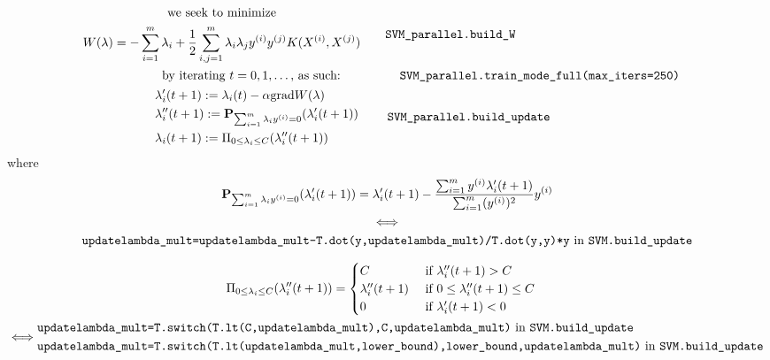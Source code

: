 \documentclass[10pt]{amsart}
\begin{document}
\begin{multicols*}{2}
\[
\begin{aligned}
  \begin{gathered}
    \text{ we seek to minimize } \\
    W(\lambda) = - \sum_{i=1}^m \lambda_i + \frac{1}{2} \sum_{i,j=1}^m \lambda_i \lambda_j y^{(i)} y^{(j)} K(X^{(i)},X^{(j)}) 
  \end{gathered} \quad & \quad   \verb|SVM_parallel.build_W| \\
  \text{  by iterating $t=0,1,\dots $, as such: } \qquad \, & \qquad \, \verb|SVM_parallel.train_mode_full(max_iters=250)|  \\
  \begin{aligned}
    & \lambda_i'(t+1):=\lambda_i(t) - \alpha \text{grad}{ W(\lambda) } \\ 
    & \lambda''_i(t+1):= \mathbf{P}_{\sum_{i=1}^m \lambda_i y^{(i)} = 0 }( \lambda_i'(t+1)) \\ 
    & \lambda_i(t+1) := \Pi_{0\leq \lambda_i \leq C}(\lambda_i''(t+1))
  \end{aligned} \quad \, &
  \quad \, \verb|SVM_parallel.build_update|  
  \end{aligned}
\]
where
\[
\begin{gathered}
\mathbf{P}_{\sum_{i=1}^m \lambda_i y^{(i)} = 0 }( \lambda_i'(t+1)) = \lambda_i'(t+1) - \frac{ \sum_{i=1}^m y^{(i)}\lambda_i'(t+1) }{ \sum_{i=1}^m (y^{(i)})^2 } y^{(i)} \\ 
\Longleftrightarrow \\
\verb|updatelambda_mult=updatelambda_mult-T.dot(y,updatelambda_mult)/T.dot(y,y)*y| \text{ in } \verb|SVM.build_update|
\end{gathered}
\]

\[
\begin{gathered}
  \begin{aligned}
  & \Pi_{0\leq \lambda_i \leq C}(\lambda_i''(t+1)) = \begin{cases} C & \text{ if } \lambda_i''(t+1) > C \\
    \lambda_i''(t+1) & \text{ if } 0 \leq \lambda_i''(t+1) \leq C \\
    0 & \text{ if } \lambda_i'(t+1) <0 \end{cases}
  \end{aligned}  \\ 
  \Longleftrightarrow \begin{aligned}
        & \verb|updatelambda_mult=T.switch(T.lt(C,updatelambda_mult),C,updatelambda_mult)| \text{ in } \verb|SVM.build_update| \\ 
      & \verb|updatelambda_mult=T.switch(T.lt(updatelambda_mult,lower_bound),lower_bound,updatelambda_mult)| \text{ in } \verb|SVM.build_update| 
      \end{aligned}
  \end{gathered}
  \]


\end{multicols*}
\end{document}
